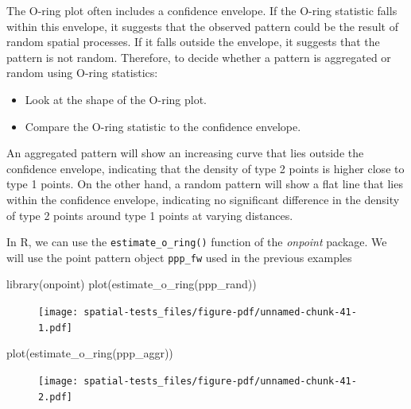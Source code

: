 \documentclass[
  letterpaper,
]{book}
\newenvironment{Shaded}{\begin{snugshade}}{\end{snugshade}}
\newcommand{\FunctionTok}[1]{\textcolor[rgb]{0.28,0.35,0.67}{#1}}
\newcommand{\NormalTok}[1]{\textcolor[rgb]{0.00,0.23,0.31}{#1}}
\begin{document}
The O-ring plot often includes a confidence envelope. If the O-ring
statistic falls within this envelope, it suggests that the observed
pattern could be the result of random spatial processes. If it falls
outside the envelope, it suggests that the pattern is not random.
Therefore, to decide whether a pattern is aggregated or random using
O-ring statistics:

\begin{itemize}
\item
  Look at the shape of the O-ring plot.
\item
  Compare the O-ring statistic to the confidence envelope.
\end{itemize}

An aggregated pattern will show an increasing curve that lies outside
the confidence envelope, indicating that the density of type 2 points is
higher close to type 1 points. On the other hand, a random pattern will
show a flat line that lies within the confidence envelope, indicating no
significant difference in the density of type 2 points around type 1
points at varying distances.

In R, we can use the \texttt{estimate\_o\_ring()} function of the
\emph{onpoint} package. We will use the point pattern object
\texttt{ppp\_fw} used in the previous examples

\begin{Shaded}
\begin{Highlighting}[]
\FunctionTok{library}\NormalTok{(onpoint)}
\FunctionTok{plot}\NormalTok{(}\FunctionTok{estimate\_o\_ring}\NormalTok{(ppp\_rand))}
\end{Highlighting}
\end{Shaded}

\begin{figure}[H]

\texttt{[image: spatial-tests\_files/figure-pdf/unnamed-chunk-41-1.pdf]} \hfill{}

\end{figure}

\begin{Shaded}
\begin{Highlighting}[]
\FunctionTok{plot}\NormalTok{(}\FunctionTok{estimate\_o\_ring}\NormalTok{(ppp\_aggr))}
\end{Highlighting}
\end{Shaded}

\begin{figure}[H]

\texttt{[image: spatial-tests\_files/figure-pdf/unnamed-chunk-41-2.pdf]} \hfill{}

\end{figure}
\end{document}
